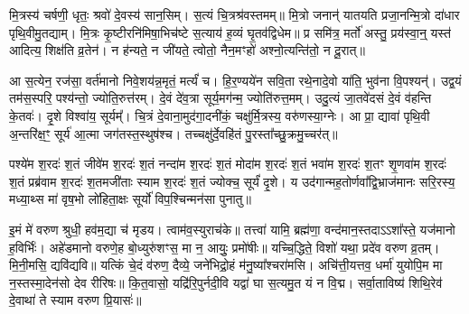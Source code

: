 मि॒त्रस्य॑ चर्\mbox{}षणी॒ धृतः॒ श्रवो॑ दे॒वस्य॑ सान॒सिम्। स॒त्यं चि॒त्रश्र॑वस्तमम्॥ मि॒त्रो जनान्॑ यातयति प्रजा॒नन्मि॒त्रो दा॑धार पृथि॒वीमु॒तद्याम्। मि॒त्रः कृ॒ष्टीरनि॑मिषा॒भिच॑ष्टे स॒त्याय॑ ह॒व्यं घृ॒तव॑द्विधेम॥ प्र समि॑त्र॒ मर्तो॑ अस्तु॒ प्रय॑स्वा॒न्॒ यस्त॑ आदित्य॒ शिक्ष॑ति व्र॒तेन॑। न ह॑न्यते॒ न जी॑यते॒ त्वोतो॒ नैन॒मꣳहो॑ अश्नो॒त्यन्ति॑तो॒ न दू॒रात्॥

आ स॒त्येन॒ रज॑सा॒ वर्त॑मानो निवे॒शय॑न्न॒मृतं॒ मर्त्यं॑ च। हि॒र॒ण्यये॑न सवि॒ता रथे॒नादे॒वो या॑ति॒ भुव॑ना वि॒पश्यन्॑। उद्व॒यं तम॑स॒स्परि॒ पश्य॑न्तो॒ ज्योति॒रुत्त॑रम्। दे॒वं दे॑व॒त्रा सूर्य॒मग॑न्म॒ ज्योति॑रुत्त॒मम्। उदु॒त्यं जा॒तवे॑दसं दे॒वं व॑हन्ति के॒तवः॑। दृ॒शे विश्वा॑य॒ सूर्यम्᳚। चि॒त्रं दे॒वाना॒मुद॑गा॒दनी॑कं॒ चक्षु॑र्मि॒त्रस्य॒ वरु॑णस्या॒ग्नेः। आ प्रा॒ द्यावा॑ पृथि॒वी अ॒न्तरि॑क्ष॒ꣳ॒ सूर्य॑ आ॒त्मा जग॑तस्त॒स्थुष॑श्च। तच्चक्षु॑र्दे॒वहि॑तं पु॒रस्ता᳚च्छु॒क्रमु॒च्चर॑त्॥

पश्ये॑म श॒रदः॑ श॒तं जीवे॑म श॒रदः॑ श॒तं नन्दा॑म श॒रदः॑ श॒तं मोदा॑म श॒रदः॑ श॒तं भवा॑म श॒रदः॑ श॒तꣳ शृ॒णवा॑म श॒रदः॑ श॒तं प्रब्र॑वाम श॒रदः॑ श॒तमजी॑ताः स्याम श॒रदः॑ श॒तं ज्योक्च॒ सूर्यं॑ दृ॒शे। य उद॑गान्मह॒तोर्णवा᳚द्वि॒भ्राज॑मानः सरि॒रस्य॒ मध्या॒थ्स मा॑ वृष॒भो लो॑हिता॒क्षः सूर्यो॑ विप॒श्चिन्मन॑सा पुनातु॥

इ॒मं मे॑ वरुण श्रुधी॒ हव॑म॒द्या च॑ मृडय। त्वाम॑व॒स्युराच॑के॥ तत्त्वा॑ यामि॒ ब्रह्म॑णा॒ वन्द॑मान॒स्तदाऽऽशा᳚स्ते॒ यज॑मानो ह॒विर्भिः॑। अहे॑डमानो वरुणे॒ह बो॒ध्युरु॑शꣳस॒ मा न॒ आयुः॒ प्रमो॑षीः॥
यच्चि॒द्धिते॒ विशो॑ यथा॒ प्रदे॑व वरुण व्र॒तम्। मि॒नी॒मसि॒ द्यवि॑द्यवि॥ यत्किं चे॒दं व॑रुण॒ दैव्ये॒ जने॑भिद्रो॒हं म॑नु॒ष्या᳚श्चरा॑मसि। अचि॑त्ती॒यत्तव॒ धर्मा॑ युयोपि॒म मा न॒स्तस्मा॒देन॑सो देव रीरिषः॥ कि॒त॒वासो॒ यद्रि॑रि॒पुर्नदी॒वि यद्वा॑ घा स॒त्यमु॒त यं न वि॒द्म। सर्वा॒ताविष्य॑ शिथि॒रेव॑ दे॒वाथा॑ ते स्याम वरुण प्रि॒यासः॑॥